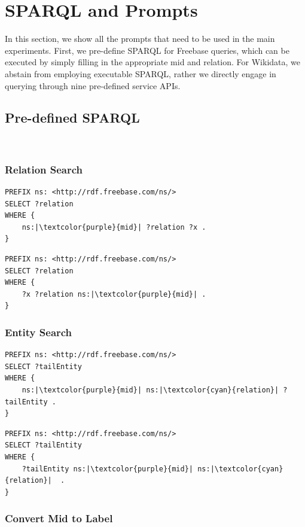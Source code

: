 \documentclass{article} %
\begin{document}
\newpage

\section{SPARQL and Prompts}
In this section, we show all the prompts that need to be used in the main experiments. First, we pre-define SPARQL for Freebase queries, which can be executed by simply filling in the appropriate mid and relation. For Wikidata, we abstain from employing executable SPARQL, rather we directly engage in querying through nine pre-defined service APIs.
\subsection{Pre-defined SPARQL}~\label{sparqls}
\subsubsection{Relation Search}
\lstset{language=SPARQL}
\begin{lstlisting}
PREFIX ns: <http://rdf.freebase.com/ns/>
SELECT ?relation
WHERE {
    ns:|\textcolor{purple}{mid}| ?relation ?x . 
}
\end{lstlisting}

\lstset{language=SPARQL}
\begin{lstlisting}
PREFIX ns: <http://rdf.freebase.com/ns/>
SELECT ?relation
WHERE {
    ?x ?relation ns:|\textcolor{purple}{mid}| .
}
\end{lstlisting}

\subsubsection{Entity Search}
\lstset{language=SPARQL}
\begin{lstlisting}
PREFIX ns: <http://rdf.freebase.com/ns/>
SELECT ?tailEntity
WHERE {
    ns:|\textcolor{purple}{mid}| ns:|\textcolor{cyan}{relation}| ?tailEntity . 
}

\end{lstlisting}

\lstset{language=SPARQL}
\begin{lstlisting}
PREFIX ns: <http://rdf.freebase.com/ns/>
SELECT ?tailEntity
WHERE {
    ?tailEntity ns:|\textcolor{purple}{mid}| ns:|\textcolor{cyan}{relation}|  . 
}
\end{lstlisting}

\subsubsection{Convert Mid to Label}
\end{document}
